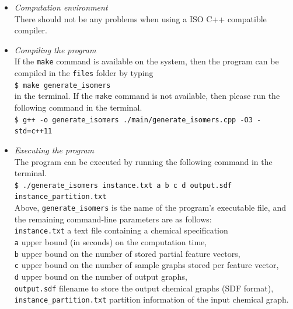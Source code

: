 \documentclass[11pt,titlepage,dvipdfmx,twoside]{book}
\begin{document}
\begin{itemize}
	\item {\em Computation environment}\\
		There should not be any problems when using a ISO C++ compatible compiler. %
	\item {\em Compiling the program}\\
		If the {\tt make} command is available on the system, 
		then the program can be compiled in the {\tt files} folder by typing \\
		\verb|$ make generate_isomers|\\
		in the terminal.
		If the {\tt make} command is not available, then
		please run the following command in the terminal.\\
		\verb|$ g++ -o generate_isomers ./main/generate_isomers.cpp -O3 -std=c++11|\\
	\item {\em Executing the program}\\
		The program can be executed by running the following command in the terminal.\\
		\verb|$ ./generate_isomers instance.txt a b c d output.sdf instance_partition.txt|\\
		Above, {\tt generate\_isomers} is the name of the program's executable file, and the remaining command-line
		parameters are as follows: \\
		\verb|instance.txt|  a text file containing a chemical specification \\
		\verb|a| upper bound (in seconds) on the computation time, \\
		\verb|b| upper bound on the number of stored partial feature vectors, \\
		\verb|c| upper bound on the number of sample graphs stored per feature vector, \\
		\verb|d| upper bound on the number of output graphs, \\
		\verb|output.sdf| filename to store the output chemical graphs (SDF format), \\
		\verb|instance_partition.txt|  partition information of the input chemical graph.
\end{itemize}
\end{document}
